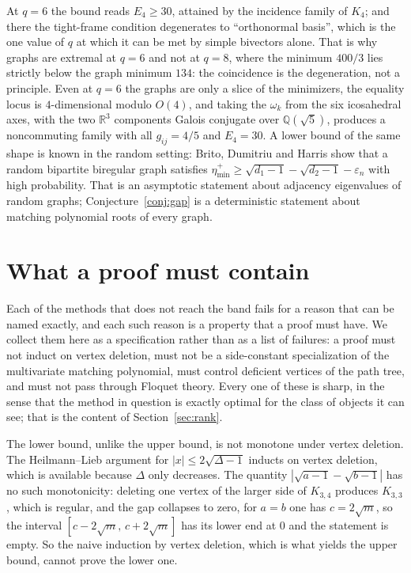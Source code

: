 \documentclass[11pt]{article}
\theoremstyle{remark}
\begin{document}
At $q=6$ the bound reads $E_4\ge30$, attained by the incidence family of $K_4$; and
there the tight-frame condition degenerates to ``orthonormal basis'', which is the
one value of $q$ at which it can be met by simple bivectors alone. That is why
graphs are extremal at $q=6$ and not at $q=8$, where the minimum $400/3$ lies
strictly below the graph minimum $134$: the coincidence is the degeneration, not a
principle. Even at $q=6$ the graphs are only a slice of the minimizers, the
equality locus is $4$-dimensional modulo $O(4)$, and taking the $\omega_k$ from the
six icosahedral axes, with the two $\mathbb R^3$ components Galois conjugate over
$\mathbb Q(\sqrt5)$, produces a noncommuting family with all
$g_{ij}=4/5$ and $E_4=30$. A lower bound of the same shape is known in the random setting: Brito,
Dumitriu and Harris \cite{BDH} show that a random bipartite biregular graph
satisfies $\eta^+_{\min}\ge\sqrt{d_1-1}-\sqrt{d_2-1}-\varepsilon_n$ with high
probability. That is an asymptotic statement about adjacency eigenvalues of
random graphs; Conjecture~\ref{conj:gap} is a deterministic statement about
matching polynomial roots of every graph.

\section{What a proof must contain}\label{sec:must}

Each of the methods that does not reach the band fails for a reason that can be
named exactly, and each such reason is a property that a proof must have. We
collect them here as a specification rather than as a list of failures: a proof
must not induct on vertex deletion, must not be a side-constant specialization of
the multivariate matching polynomial, must control deficient vertices of the path
tree, and must not pass through Floquet theory. Every one of these is sharp, in
the sense that the method in question is exactly optimal for the class of objects
it can see; that is the content of Section~\ref{sec:rank}.

The lower bound, unlike the upper bound, is not monotone
under vertex deletion. The Heilmann--Lieb argument for $|x|\le2\sqrt{\Delta-1}$
inducts on vertex deletion, which is available because $\Delta$ only decreases.
The quantity $|\sqrt{a-1}-\sqrt{b-1}|$ has no such monotonicity: deleting one
vertex of the larger side of $K_{3,4}$ produces $K_{3,3}$, which is regular, and
the gap collapses to zero, for $a=b$ one has $c=2\sqrt m$, so the interval
$[c-2\sqrt m,\,c+2\sqrt m]$ has its lower end at $0$ and the statement is empty. So the naive induction by vertex deletion, which is
what yields the upper bound, cannot prove the lower one.
\end{document}

